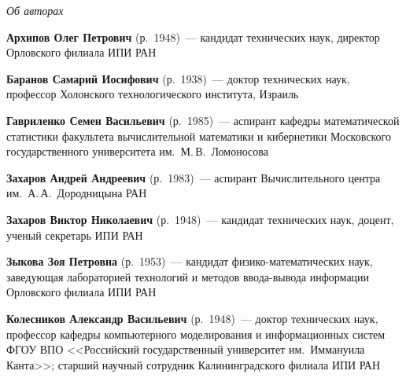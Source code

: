 \begin{center}\LARGE
\textit{Об авторах}
\end{center}

\thispagestyle{empty}



\vspace*{48pt}


\begin{multicols}{2}

\noindent
\textbf{Архипов Олег Петрович} (р.\ 1948)~--- кандидат технических наук, директор Орловского филиала ИПИ РАН

\vspace*{3pt}

\noindent
\textbf{Баранов Самарий Иосифович} (р.\ 1938)~--- доктор технических наук, 
профессор Холонского технологического института, Израиль

\vspace*{3pt}

\noindent
\textbf{Гавриленко Семен Васильевич} (р.\ 1985)~--- аспирант
кафедры математической статистики факультета вычислительной математики и кибернетики 
Московского государственного университета им.~М.\,В.~Ломоносова

\vspace*{3pt}

\noindent 
\textbf{Захаров Андрей Андреевич} (р.\ 1983)~--- аспирант Вычислительного центра им.\
А.\,А.~Дородницына РАН

\vspace*{3pt}


\noindent
\textbf{Захаров Виктор Николаевич} (р.\ 1948)~--- 
кандидат технических наук, доцент, ученый секретарь ИПИ РАН

\vspace*{3pt}

\noindent
\textbf{Зыкова Зоя Петровна} (р.\ 1953)~--- кандидат физико-ма\-те\-ма\-тических наук, 
заведующая лабораторией технологий и методов ввода-вывода информации Орловского филиала ИПИ РАН

\vspace*{3pt}

\noindent
\textbf{Колесников Александр Васильевич} (р.\ 1948)~--- доктор технических наук,
профессор кафедры компьютерного моделирования и информационных систем ФГОУ
ВПО <<Российский государственный университет им.\ Иммануила Канта>>; старший
научный сотрудник Калининградского филиала ИПИ РАН


\end{multicols}
